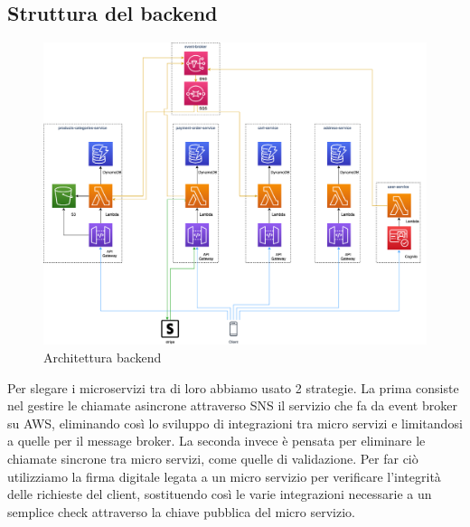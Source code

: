 \subsection{Struttura del backend}
\begin{figure}[H]
	\centering
	\includegraphics[scale=0.4]{Immagini/Backend/AWSArchitecture.png}
	\caption{Architettura backend}
	\label{fig:backend}
\end{figure}
Per slegare i microservizi tra di loro abbiamo usato 2 strategie. La prima consiste nel gestire le chiamate asincrone attraverso SNS il servizio che fa da event broker su AWS, eliminando così lo sviluppo di integrazioni tra micro servizi e limitandosi a quelle per il message broker.
La seconda invece è pensata per eliminare le chiamate sincrone tra micro servizi, come quelle di validazione. Per far ciò utilizziamo la firma digitale legata a un micro servizio per verificare l'integrità delle richieste del client, sostituendo così le varie integrazioni necessarie a un semplice check attraverso la chiave pubblica del micro servizio.

